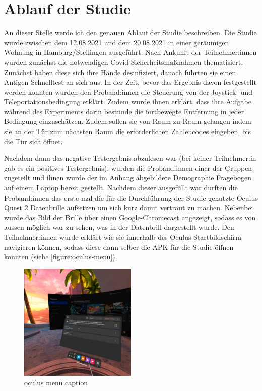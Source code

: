     \section{Ablauf der Studie}
        An dieser Stelle werde ich den genauen Ablauf der Studie beschreiben.
        Die Studie wurde zwischen dem 12.08.2021 und dem 20.08.2021 in einer geräumigen Wohnung in Hamburg/Stellingen ausgeführt. Nach Ankunft der Teilnehmer:innen wurden zunächst die notwendigen Covid-Sicherheitsmaßnahmen thematisiert.
        Zunächst haben diese sich ihre Hände desinfiziert, danach führten sie einen Antigen-Schnelltest an sich aus. In der Zeit, bevor das Ergebnis davon festgestellt werden konnten wurden den Proband:innen die Steuerung von der Joystick- und Teleportationsbedingung erklärt.
        Zudem wurde ihnen erklärt, dass ihre Aufgabe während des Experiments darin bestünde die fortbewegte Entfernung in jeder Bedingung einzuschätzen. Zudem sollen sie von Raum zu Raum gelangen indem sie an der Tür zum nächsten Raum die erforderlichen Zahlencodes eingeben, bis die Tür sich öffnet.

        Nachdem dann das negative Testergebnis abzulesen war (bei keiner Teilnehmer:in gab es ein positives Testergebnis), wurden die Proband:innen einer der Gruppen zugeteilt %
        und ihnen wurde der im Anhang %
        abgebildete Demographie Fragebogen auf einem Laptop bereit gestellt. Nachdem dieser ausgefüllt war durften die Proband:innen das erste mal die für die Durchführung der Studie genutzte Oculus Quest 2 Datenbrille aufsetzen um sich kurz damit vertraut zu machen. Nebenbei wurde das Bild der Brille über einen Google-Chromecast angezeigt, sodass es von aussen möglich war zu sehen, was in der Datenbrill dargestellt wurde. Den Teilnehmer:innen wurde erklärt wie sie innerhalb des Oculus Startbildschirm navigieren können, sodass diese dann selber die APK für die Studie öffnen konnten (siehe \autoref{figure:oculus-menu}).


        \begin{figure}[!h]
            \centering
            \includegraphics[width=0.5\textwidth]{vrscreenshots/oculusmenu.jpg}
            \caption{oculus menu caption}\label{figure:oculus-menu}
        \end{figure}


